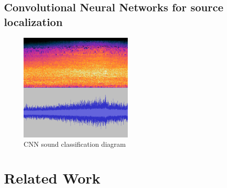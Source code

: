 \subsection{Convolutional Neural Networks for source localization}

\begin{figure}[h]
    \centering
    \includegraphics[width=0.5\textwidth]{../images/spectrogram.png}
    \caption{CNN sound classification diagram}
    \label{fig:cnn_sound_classification}
\end{figure}

\section{Related Work}

\subsection{}


